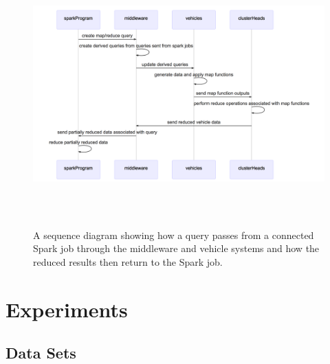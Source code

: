 \documentclass{thesis}
\begin{document}
    \begin{figure}
        \centering
        \includegraphics[height=4in, width=6in]{binImages/theoretical-sequence.png}
        \caption{A sequence diagram showing how a query passes from a connected Spark job
        through the middleware and vehicle systems and how the reduced results then return
        to the Spark job.}
        \label{fig:theoretical:sequence}
    \end{figure}




\chapter{Experiments}
\section{Data Sets}
\end{document}
